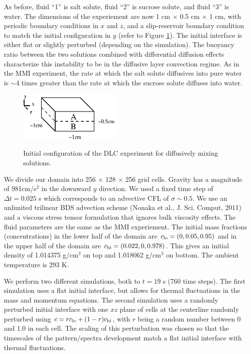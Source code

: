 \documentclass[final]{siamltex}
\begin{document}
As before, fluid ``1'' is salt solute, fluid ``2'' is sucrose solute, and fluid ``3'' is water.
The dimensions of the experiement are now 1 cm $\times$ 0.5 cm $\times$ 1 cm, with
periodic boundary conditions in $x$ and $z$, and a slip-reservoir boundary condition to match 
the initial configuration in $y$ (refer to Figure \ref{fig:dlc}).
The initial interface is either flat or slightly perturbed (depending on the simulation).
The buoyancy ratio between the two solutions combined with 
differential diffusion effects characterize this instability to be in the diffusive layer convection regime.
As in the MMI experiment, the rate at which the salt solute diffusives into pure water is $\sim$4 times greater 
than the rate at which the sucrose solute diffuses into water.
\begin{figure}[hb]
\centering
\includegraphics[width=2in]{dlc}
\label{fig:dlc}
\caption{Initial configuration of the DLC experiment for diffusively mixing solutions.}
\end{figure}

We divide our domain into 256 $\times$ 128 $\times$ 256 grid cells.  Gravity has a magnitude of 
981cm/s$^2$ in the downward $y$ direction.  We used a fixed time step of $\Delta t = 0.025$ s which
corresponds to an advective CFL of $\sigma\sim 0.5$.  We use an unlimited trilinear
BDS advection scheme (Nonaka et al., J. Sci. Comput, 2011) and a viscous stress tensor formulation that 
ignores bulk viscosity effects.  The fluid parameters are the same as the MMI experiement.
The initial mass fractions (concentrations) in the 
lower half of the domain are $c_{\rm lo} = (0, 0.05, 0.95)$ and in the upper half of the domain
are $c_{\rm hi} = (0.022, 0, 0.978)$.  This gives an initial density of 1.014375 g/cm$^3$ on top 
and 1.018062 g/cm$^3$ on bottom.  The ambient temperature is 293 K.

We perform two different simulations, both to $t=19$ s (760 time steps).
The first simulation uses a flat initial interface, but allows for thermal fluctuations in the mass
and momentum equations.  The second simulation uses a randomly perturbed initial interface with one $xz$ plane 
of cells at the centerline randomly perturbed using $c = r c_{\rm lo} + (1-r) c_{\rm hi}$, with $r$ being a 
random number between 0 and 1.0 in each cell.  The scaling of this perturbation was chosen
so that the timescales of the pattern/spectra development match a flat initial interface with thermal fluctuations.
\end{document}
